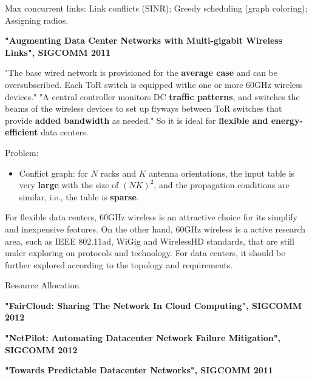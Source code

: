 \documentclass[journal,onecolumn,11pt]{IEEEtran}
\begin{document}
Max concurrent links: Link conflicts (SINR); Greedy scheduling (graph coloring); Assigning radios.


\textbf{"Augmenting Data Center Networks with Multi-gigabit Wireless Links", SIGCOMM 2011}

"The base wired network is provisioned for the \textbf{average case} and can be oversubscribed. Each ToR switch is equipped withe one or more 60GHz wireless devices." "A central controller monitors DC \textbf{traffic patterns}, and switches the beams of the wireless devices to set up flyways between ToR switches that provide \textbf{added bandwidth} as needed." So it is ideal for \textbf{flexible and energy-efficient} data centers.

Problem:
\begin{itemize}
  \item Conflict graph: for $N$ racks and $K$ antenna orientations, the input table is very \textbf{large} with the size of $(NK)^2$, and the propagation conditions are similar, i.e., the table is \textbf{sparse}.
\end{itemize}

For flexible data centers, 60GHz wireless is an attractive choice for its simplify and inexpensive features. On the other hand, 60GHz wireless is a active research area, such as IEEE 802.11ad, WiGig and WirelessHD standards, that are still under exploring on protocols and technology. For data centers, it should be further explored according to the topology and requirements.

Resource Allocation

\textbf{"FairCloud: Sharing The Network In Cloud Computing", SIGCOMM 2012}

\textbf{"NetPilot: Automating Datacenter Network Failure Mitigation", SIGCOMM 2012}

\textbf{"Towards Predictable Datacenter Networks", SIGCOMM 2011}

\renewcommand\refname{References}
%


\end{document}

